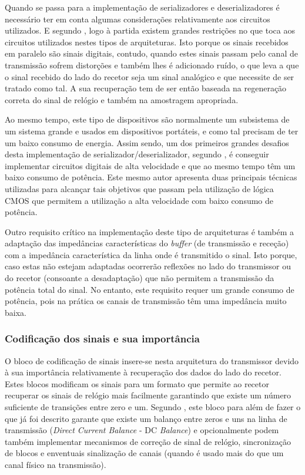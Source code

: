 Quando se passa para a implementação de serializadores e deserializadores é necessário ter em conta algumas considerações relativamente aos circuitos utilizados. E segundo \cite{R012}, logo à partida existem grandes restrições no que toca aos circuitos utilizados nestes tipos de arquiteturas. Isto porque os sinais recebidos em paralelo são sinais digitais, contudo, quando estes sinais passam pelo canal de transmissão sofrem distorções e também lhes é adicionado ruído, o que leva a que o sinal recebido do lado do recetor seja um sinal analógico e que necessite de ser tratado como tal. A sua recuperação tem de ser então baseada na regeneração correta do sinal de relógio e também na amostragem apropriada. 
	
Ao mesmo tempo, este tipo de dispositivos são normalmente um subsistema de um sistema grande e usados em dispositivos portáteis, e como tal precisam de ter um baixo consumo de energia. Assim sendo, um dos primeiros grandes desafios desta implementação de serializador/deserializador, segundo \cite{R012}, é conseguir implementar circuitos digitais de alta velocidade e que ao mesmo tempo têm um baixo consumo de potência. Este mesmo autor apresenta duas principais técnicas utilizadas para alcançar tais objetivos que passam pela utilização de lógica CMOS que permitem a utilização a alta velocidade com baixo consumo de potência. 
	
Outro requisito crítico na implementação deste tipo de arquiteturas é também a adaptação das impedâncias características do \textit{buffer} (de transmissão e receção) com a impedância característica da linha onde é transmitido o sinal. Isto porque, caso estas não estejam adaptadas ocorrerão reflexões no lado do transmissor ou do recetor (consoante a desadaptação) que não permitem a transmissão da potência total do sinal. No entanto, este requisito requer um grande consumo de potência, pois na prática os canais de transmissão têm uma impedância muito baixa. 


\subsubsection*{Codificação dos sinais e sua importância}

O bloco de codificação de sinais insere-se nesta arquitetura do transmissor devido à sua importância relativamente à recuperação dos dados do lado do recetor. Estes blocos modificam os sinais para um formato que permite ao recetor recuperar os sinais de relógio mais facilmente garantindo que existe um número suficiente de transições entre zero e um. Segundo \cite{R032}, este bloco para além de fazer o que já foi descrito garante que existe um balanço entre zeros e uns na linha de transmissão (\textit{Direct Current Balance} - DC \textit{Balance}) e opcionalmente podem também implementar mecanismos de correção de sinal de relógio, sincronização de blocos e enventuais sinalização de canais (quando é usado mais do que um canal físico na transmissão).

